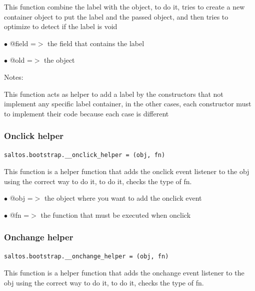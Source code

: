 \documentclass[a4paper]{article}
\begin{document}
This function combine the label with the object, to do it, tries to create a new
container object to put the label and the passed object, and then tries to optimize
to detect if the label is void

\begin{compactitem}
\item[\color{myblue}$\bullet$] @field =$>$ the field that contains the label
\item[\color{myblue}$\bullet$] @old   =$>$ the object
\end{compactitem}

Notes:

This function acts as helper to add a label by the constructors that not implement
any specific label container, in the other cases, each constructor must to implement
their code because each case is different

\hypertarget{toc99}{}
\subsubsection{Onclick helper}

\begin{lstlisting}
saltos.bootstrap.__onclick_helper = (obj, fn)
\end{lstlisting}

This function is a helper function that adds the onclick event listener to the obj
using the correct way to do it, to do it, checks the type of fn.

\begin{compactitem}
\item[\color{myblue}$\bullet$] @obj   =$>$ the object where you want to add the onclick event
\item[\color{myblue}$\bullet$] @fn    =$>$ the function that must be executed when onclick
\end{compactitem}

\hypertarget{toc100}{}
\subsubsection{Onchange helper}

\begin{lstlisting}
saltos.bootstrap.__onchange_helper = (obj, fn)
\end{lstlisting}

This function is a helper function that adds the onchange event listener to the obj
using the correct way to do it, to do it, checks the type of fn.
\end{document}
